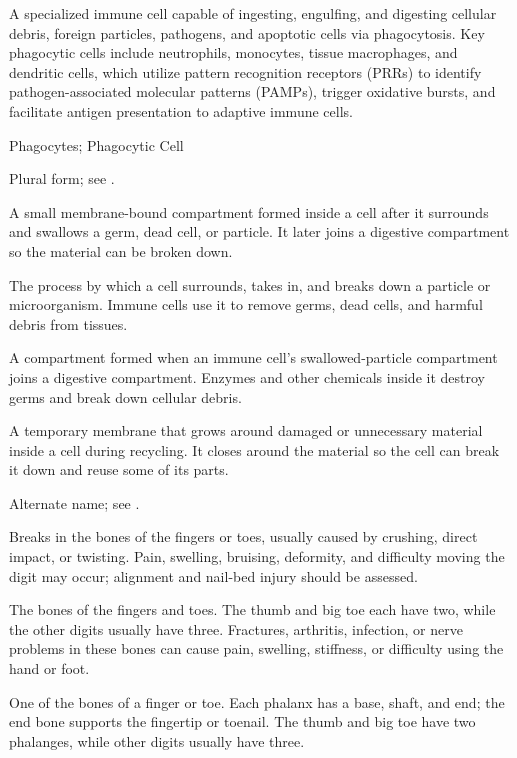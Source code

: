  A specialized immune cell capable of ingesting, engulfing, and digesting cellular debris, foreign particles, pathogens, and apoptotic cells via phagocytosis. Key phagocytic cells include neutrophils, monocytes, tissue macrophages, and dendritic cells, which utilize pattern recognition receptors (PRRs) to identify pathogen-associated molecular patterns (PAMPs), trigger oxidative bursts, and facilitate antigen presentation to adaptive immune cells.

\synonyms
Phagocytes; Phagocytic Cell

 Plural form; see .

 A small membrane-bound compartment formed inside a cell after it surrounds and swallows a germ, dead cell, or particle. It later joins a digestive compartment so the material can be broken down.

 The process by which a cell surrounds, takes in, and breaks down a particle or microorganism. Immune cells use it to remove germs, dead cells, and harmful debris from tissues.

 A compartment formed when an immune cell’s swallowed-particle compartment joins a digestive compartment. Enzymes and other chemicals inside it destroy germs and break down cellular debris.

 A temporary membrane that grows around damaged or unnecessary material inside a cell during recycling. It closes around the material so the cell can break it down and reuse some of its parts.

 Alternate name; see .

 Breaks in the bones of the fingers or toes, usually caused by crushing, direct impact, or twisting. Pain, swelling, bruising, deformity, and difficulty moving the digit may occur; alignment and nail-bed injury should be assessed.

 The bones of the fingers and toes. The thumb and big toe each have two, while the other digits usually have three. Fractures, arthritis, infection, or nerve problems in these bones can cause pain, swelling, stiffness, or difficulty using the hand or foot.

 One of the bones of a finger or toe. Each phalanx has a base, shaft, and end; the end bone supports the fingertip or toenail. The thumb and big toe have two phalanges, while other digits usually have three.

